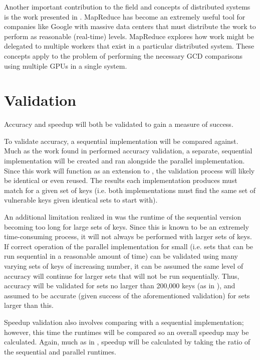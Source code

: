 \documentclass[12pt]{ucthesis}
\begin{document}
Another important contribution to the field and concepts of distributed systems
is the work presented in \cite{dean2008mapreduce}. MapReduce has become an
extremely useful tool for companies like Google with massive data centers that
must distribute the work to perform as reasonable (real-time) levels. MapReduce
explores how work might be delegated to multiple workers that exist in a
particular distributed system. These concepts apply to the problem of
performing the necessary GCD comparisons using multiple GPUs in a single
system.

\chapter{Validation}
Accuracy and speedup will both be validated to gain a measure of success.

To validate accuracy, a sequential implementation will be compared against.
Much as the work found in \cite{scharfglass2012CUDA} performed accuracy
validation, a separate, sequential implementation will be created and ran
alongside the parallel implementation. Since this work will function as an
extension to \cite{scharfglass2012CUDA}, the validation process will likely be
identical or even reused. The results each implementation produces must match
for a given set of keys (i.e. both implementations must find the same set of
vulnerable keys given identical sets to start with).

An additional limitation realized in \cite{scharfglass2012CUDA} was the runtime
of the sequential version becoming too long for large sets of keys. Since this
is known to be an extremely time-consuming process, it will not always be
performed with larger sets of keys. If correct operation of the parallel
implementation for small (i.e. sets that can be run sequential in a reasonable
amount of time) can be validated using many varying sets of keys of increasing
number, it can be assumed the same level of accuracy will continue for larger
sets that will not be run sequentially. Thus, accuracy will be validated for
sets no larger than 200,000 keys (as in \cite{scharfglass2012CUDA}), and
assumed to be accurate (given success of the aforementioned validation) for
sets larger than this.

Speedup validation also involves comparing with a sequential implementation;
however, this time the runtimes will be compared so an overall speedup may be
calculated. Again, much as in \cite{scharfglass2012CUDA}, speedup will be
calculated by taking the ratio of the sequential and parallel runtimes.
\end{document}
